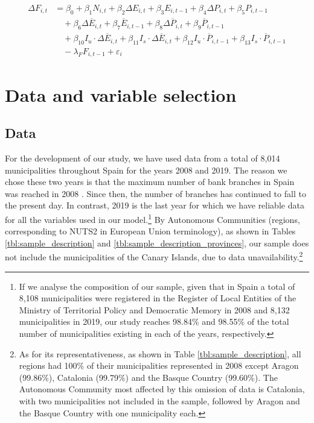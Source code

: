 \documentclass[a4paper,11pt,oneside]{article}
\newcommand{\Emili}{\color{emili}}
\begin{document}
\begin{equation}
\label{eq:bank}
\begin{aligned}
\Delta F_{i,t} &= \beta_0 + \beta_1 N_{i,t} + \beta_2 \Delta E_{i,t} + \beta_3 E_{i,t-1} + \beta_4 \Delta P_{i,t} + \beta_5 P_{i,t-1} \\
&\quad + \beta_6 \Delta \overline{E}_{i,t} + \beta_7 \overline{E}_{i,t-1} + \beta_8 \Delta \overline{P}_{i,t} + \beta_9 \overline{P}_{i,t-1} \\
&\quad + \beta_{10} I_u \cdot \Delta \overline{E}_{i,t} + \beta_{11} I_s \cdot \Delta \overline{E}_{i,t} + \beta_{12} I_u \cdot \overline{P}_{i,t-1} + \beta_{13} I_s \cdot \overline{P}_{i,t-1} \\
&\quad - \lambda_F F_{i,t-1} + \varepsilon_{i}
\end{aligned}
\end{equation}






\section{Data and variable selection}
\label{sec:data_variables}


\Emili

\subsection{Data}
\label{sec:data}


For the development of our study, we have used data from a total of 8,014 municipalities throughout Spain for the years 2008 and 2019. The reason we chose these two years is that the maximum number of bank branches in Spain was reached in 2008 \citep{goerlich2021distribucion}. Since then, the number of branches has continued to fall to the present day. In contrast, 2019 is the last year for which we have reliable data for all the variables used in our model.\footnote{If we analyse the composition of our sample, given that in Spain a total of 8,108 municipalities were registered in the Register of Local Entities of the Ministry of Territorial Policy and Democratic Memory in 2008 and 8,132 municipalities in 2019, our study reaches 98.84\% and 98.55\% of the total number of municipalities existing in each of the years, respectively.} By Autonomous Communities (regions, corresponding to NUTS2 in European Union terminology), as shown in Tables \ref{tbl:sample_description} and \ref{tbl:sample_description_provinces}, our sample does not include the municipalities of the Canary Islands, due to data unavailability.\footnote{As for its representativeness, as shown in Table \ref{tbl:sample_description}, all regions had 100\% of their municipalities represented in 2008 except Aragon (99.86\%), Catalonia (99.79\%) and the Basque Country (99.60\%). The Autonomous Community most affected by this omission of data is Catalonia, with two municipalities not included in the sample, followed by Aragon and the Basque Country with one municipality each.}
\end{document}
